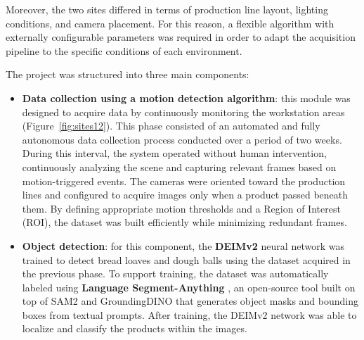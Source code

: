 Moreover, the two sites differed in terms of production line layout, lighting conditions, and camera placement. For this reason, a flexible algorithm with externally configurable parameters was required in order to adapt the acquisition pipeline to the specific conditions of each environment.

The project was structured into three main components:
\begin{itemize}
  \item \textbf{Data collection using a motion detection algorithm}: this module was designed to acquire data by continuously monitoring the workstation areas (Figure~\ref{fig:sites12}). This phase consisted of an automated and fully autonomous data collection process conducted over a period of two weeks. During this interval, the system operated without human intervention, continuously analyzing the scene and capturing relevant frames based on motion-triggered events. The cameras were oriented toward the production lines and configured to acquire images only when a product passed beneath them. By defining appropriate motion thresholds and a Region of Interest (ROI), the dataset was built efficiently while minimizing redundant frames.

  \item \textbf{Object detection}: for this component, the \textbf{DEIMv2} \cite{huang_real-time_2026} neural network was trained to detect bread loaves and dough balls using the dataset acquired in the previous phase. To support training, the dataset was automatically labeled using \textbf{Language Segment-Anything} \cite{medeiros_luca-medeiroslang-segment-anything_2026}, an open-source tool built on top of SAM2 and GroundingDINO that generates object masks and bounding boxes from textual prompts. After training, the DEIMv2 network was able to localize and classify the products within the images.


\end{itemize}

